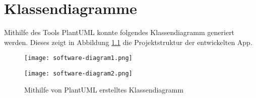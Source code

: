 
\chapter{Klassendiagramme}

Mithilfe des Tools PlantUML konnte folgendes Klassendiagramm generiert werden. Dieses zeigt in Abbildung \ref{fig:softwarediagram} die Projektstruktur der entwickelten App.

\begin{figure}[H]
    \centering
    \texttt{[image: software-diagram1.png]}
\end{figure}

\begin{figure}[H]
    \centering
    \texttt{[image: software-diagram2.png]}
    \caption{Mithilfe von PlantUML erstelltes Klassendiagramm}
    \label{fig:softwarediagram}
\end{figure}